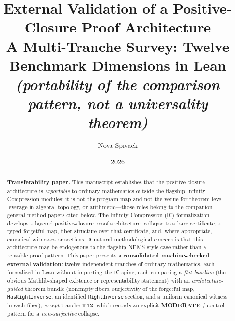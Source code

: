 \documentclass[11pt]{article}
\title{External Validation of a Positive-Closure Proof Architecture\\[0.35em]
\large A Multi-Tranche Survey: Twelve Benchmark Dimensions in Lean\\[0.25em]
\normalsize\texorpdfstring{\itshape (portability of the comparison pattern, not a universality theorem)}{(portability of the comparison pattern, not a universality theorem)}}
\author{Nova Spivack}
\date{2026}
\newcommand{\IC}{\ensuremath{\mathsf{IC}}}
\begin{document}
\maketitle
\NovaZenodoAfterTitle


\begin{abstract}
\raggedright
\textbf{Transferability paper.} This manuscript establishes that the positive-closure
architecture is \emph{exportable} to ordinary mathematics outside the flagship
Infinity Compression modules; it is not the program map and not the venue for
theorem-level leverage in algebra, topology, or arithmetic---those roles belong to
the companion general-method papers cited below.
The Infinity Compression (\IC{}) formalization develops a layered positive-closure proof
architecture: collapse to a bare certificate, a typed forgetful map, fiber structure over
that certificate, and, where appropriate, canonical witnesses or sections. A natural
methodological concern is that this architecture may be endogenous to the flagship
NEMS-style case rather than a reusable proof pattern. This paper presents a
\textbf{consolidated machine-checked external validation}: twelve independent tranches of
ordinary mathematics, each formalized in Lean without importing the \IC{} spine, each
comparing a \emph{flat baseline} (the obvious Mathlib-shaped existence or representability
statement) with an \emph{architecture-guided} theorem bundle (nonempty fibers, surjectivity
of the forgetful map, \texttt{HasRightInverse}, an identified \texttt{RightInverse} section,
and a uniform canonical witness in each fiber), \emph{except} tranche \textbf{T12}, which
records an explicit \textbf{MODERATE} / control pattern for a \emph{non-surjective} collapse.


\end{abstract}
\end{document}
